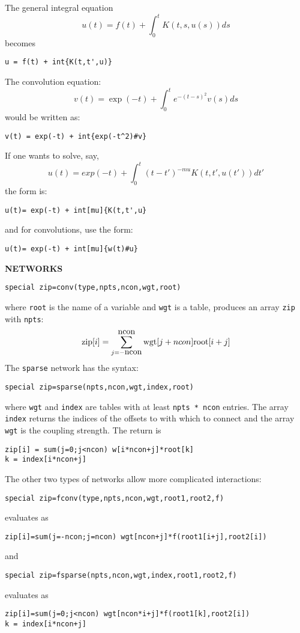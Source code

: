  
The general integral equation
\[
	u(t)=f(t)+\int_0^t K(t,s,u(s))ds
\]
becomes
\begin{verbatim}
u = f(t) + int{K(t,t',u)}
\end{verbatim}
The convolution equation:
\[
 v(t) = \exp(-t) + \int_0^t e^{-(t-s)^2}v(s) ds
\]
would be written as:
\begin{verbatim}
v(t) = exp(-t) + int{exp(-t^2)#v}
\end{verbatim}
If one wants to solve, say,
\[
 u(t) = exp(-t) + \int^t_0 (t-t')^{-mu} K(t,t',u(t'))dt'
\]
the form is:
\begin{verbatim}
u(t)= exp(-t) + int[mu]{K(t,t',u}
\end{verbatim}
and for convolutions, use the form:
\begin{verbatim}
u(t)= exp(-t) + int[mu]{w(t)#u}
\end{verbatim}
\noindent
{\bf NETWORKS}
\begin{verbatim}
special zip=conv(type,npts,ncon,wgt,root)
\end{verbatim}
where {\tt root} is the name of a variable and {\tt wgt} is a table,
produces an array {\tt zip} with {\tt npts}:
\[
\hbox{zip}[i] =\sum_{j=-\hbox{ncon}}^{\hbox{ncon}}\hbox{wgt}[j+ncon]
\hbox{root}[i+j] 
\]
The {\tt sparse} network has the syntax:
\begin{verbatim}
special zip=sparse(npts,ncon,wgt,index,root)
\end{verbatim}
where {\tt wgt} and {\tt index} are tables with at least {\tt npts *
ncon} entries.   The array {\tt index} returns the indices of the
offsets to with which to connect and the array {\tt wgt} is the
coupling strength. The return is
\begin{verbatim}
zip[i] = sum(j=0;j<ncon) w[i*ncon+j]*root[k]
k = index[i*ncon+j] 
\end{verbatim}
The other two types of networks allow more complicated interactions:
\begin{verbatim}
special zip=fconv(type,npts,ncon,wgt,root1,root2,f)
\end{verbatim}
evaluates as 
\begin{verbatim}
zip[i]=sum(j=-ncon;j=ncon) wgt[ncon+j]*f(root1[i+j],root2[i])
\end{verbatim}
and 
\begin{verbatim}
special zip=fsparse(npts,ncon,wgt,index,root1,root2,f)
\end{verbatim}
evaluates as 
\begin{verbatim}
zip[i]=sum(j=0;j<ncon) wgt[ncon*i+j]*f(root1[k],root2[i])
k = index[i*ncon+j] 
\end{verbatim}
